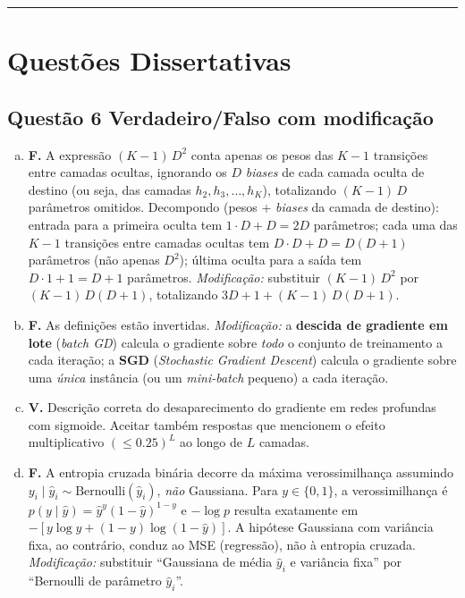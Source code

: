 \documentclass[11pt,a4paper]{article}
\begin{document}
\color{black}
\rule{\linewidth}{0.4pt}

\section*{Questões Dissertativas}

\color{blue}

\subsection*{Questão 6 \textemdash{} Verdadeiro/Falso com modificação}

\begin{enumerate}[a)]
    \item \textbf{F.} A expressão $(K - 1)\,D^2$ conta apenas os pesos das $K - 1$ transições entre camadas ocultas, ignorando os $D$ \textit{biases} de cada camada oculta de destino (ou seja, das camadas $h_2, h_3, \ldots, h_K$), totalizando $(K - 1)\,D$ parâmetros omitidos. Decompondo (pesos + \textit{biases} da camada de destino): entrada para a primeira oculta tem $1 \cdot D + D = 2D$ parâmetros; cada uma das $K - 1$ transições entre camadas ocultas tem $D \cdot D + D = D(D+1)$ parâmetros (não apenas $D^2$); última oculta para a saída tem $D \cdot 1 + 1 = D + 1$ parâmetros. \textit{Modificação:} substituir $(K - 1)\,D^2$ por $(K - 1)\,D(D+1)$, totalizando $3D + 1 + (K - 1)\,D(D+1)$.

    \item \textbf{F.} As definições estão invertidas. \textit{Modificação:} a \textbf{descida de gradiente em lote} (\textit{batch GD}) calcula o gradiente sobre \emph{todo} o conjunto de treinamento a cada iteração; a \textbf{SGD} (\textit{Stochastic Gradient Descent}) calcula o gradiente sobre uma \emph{única} instância (ou um \textit{mini-batch} pequeno) a cada iteração.

    \item \textbf{V.} Descrição correta do desaparecimento do gradiente em redes profundas com sigmoide. Aceitar também respostas que mencionem o efeito multiplicativo $(\le 0.25)^L$ ao longo de $L$ camadas.

    \item \textbf{F.} A entropia cruzada binária decorre da máxima verossimilhança assumindo $y_i \mid \hat{y}_i \sim \mathrm{Bernoulli}(\hat{y}_i)$, \emph{não} Gaussiana. Para $y \in \{0,1\}$, a verossimilhança é $p(y \mid \hat{y}) = \hat{y}^{y}(1-\hat{y})^{1-y}$ e $-\log p$ resulta exatamente em $-[y\log \hat{y} + (1-y)\log(1-\hat{y})]$. A hipótese Gaussiana com variância fixa, ao contrário, conduz ao MSE (regressão), não à entropia cruzada. \textit{Modificação:} substituir ``Gaussiana de média $\hat{y}_i$ e variância fixa'' por ``Bernoulli de parâmetro $\hat{y}_i$''.


\end{enumerate}
\end{document}
